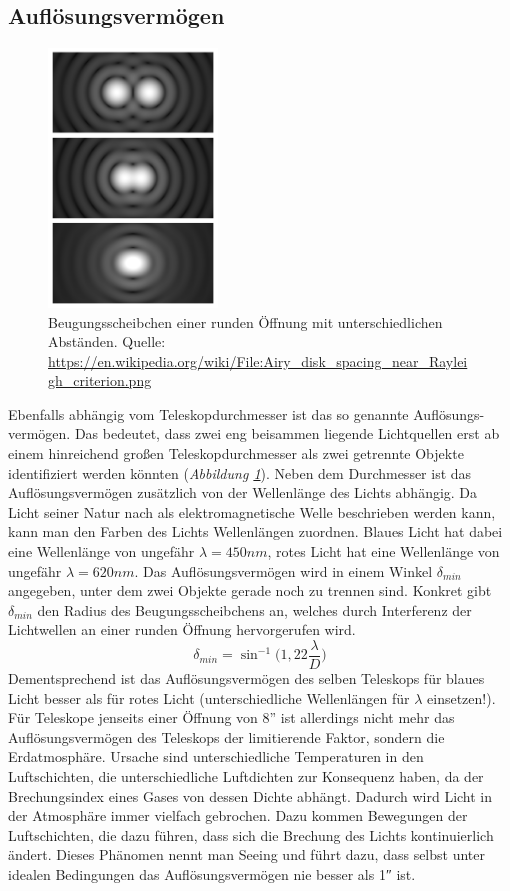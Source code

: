 \documentclass[10pt,a4paper,titlepage]{article}
\begin{document}
\subsection{Auflösungsvermögen}
\begin{figure}[h!]
  \centering
    \includegraphics[width=0.4\textwidth]{Airy_disk}
  \caption{Beugungsscheibchen einer runden Öffnung mit unterschiedlichen Abständen. Quelle: \url{https://en.wikipedia.org/wiki/File:Airy_disk_spacing_near_Rayleigh_criterion.png}}
  \label{fig:aufloesung}
\end{figure}
Ebenfalls abhängig vom Teleskopdurchmesser ist das so genannte Auflösungs-vermögen. Das bedeutet, dass zwei eng beisammen liegende Lichtquellen erst ab einem hinreichend großen Teleskopdurchmesser als zwei getrennte Objekte identifiziert werden könnten (\textit{Abbildung \ref{fig:aufloesung}}). Neben dem Durchmesser ist das Auflösungsvermögen zusätzlich von der Wellenlänge des Lichts abhängig. Da Licht seiner Natur nach als elektromagnetische Welle beschrieben werden kann, kann man den Farben des Lichts Wellenlängen zuordnen. Blaues Licht hat dabei eine Wellenlänge von ungefähr $\lambda = 450 nm$, rotes Licht hat eine Wellenlänge von ungefähr $\lambda = 620 nm$. Das Auflösungsvermögen wird in einem Winkel $\delta_{min}$ angegeben, unter dem zwei Objekte gerade noch zu trennen sind. Konkret gibt $\delta_{min}$ den Radius des Beugungsscheibchens an, welches durch Interferenz der Lichtwellen an einer runden Öffnung hervorgerufen wird.
\begin{equation}
\delta_{min} = \sin^{-1}\biggr(1,22 \frac{\lambda}{D}\biggr)
\end{equation}
Dementsprechend ist das Auflösungsvermögen des selben Teleskops für blaues Licht besser als für rotes Licht (unterschiedliche Wellenlängen für $\lambda$ einsetzen!). Für Teleskope jenseits einer Öffnung von 8'' ist allerdings nicht mehr das Auflösungsvermögen des Teleskops der limitierende Faktor, sondern die Erdatmosphäre. Ursache sind unterschiedliche Temperaturen in den Luftschichten, die unterschiedliche Luftdichten zur Konsequenz haben, da der Brechungsindex eines Gases von dessen Dichte abhängt. Dadurch wird Licht in der Atmosphäre immer vielfach gebrochen. Dazu kommen Bewegungen der Luftschichten, die dazu führen, dass sich die Brechung des Lichts kontinuierlich ändert. Dieses Phänomen nennt man Seeing und führt dazu, dass selbst unter idealen Bedingungen das Auflösungsvermögen nie besser als \ang{;;1} ist.
\end{document}

